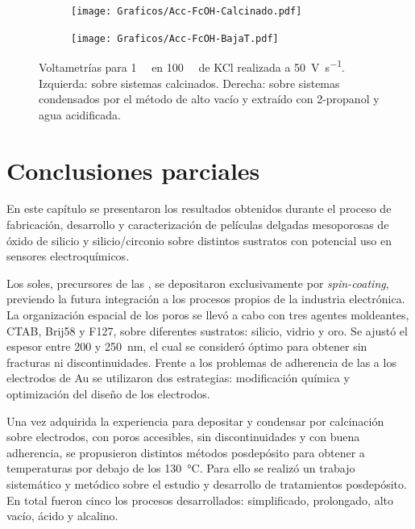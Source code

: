       		\begin{figure}[ht!]
		 	\begin{subfigure}[t]{0.5\textwidth}
		          	\texttt{[image: Graficos/Acc-FcOH-Calcinado.pdf]}
		          	\end{subfigure}
		    \begin{subfigure}[t]{0.5\textwidth}
		          	\texttt{[image: Graficos/Acc-FcOH-BajaT.pdf]}
		         	\end{subfigure}
		         	\caption[Voltagrama comparativo SF calcinados/alto vacío II]{Voltametrías para \fc\space \SI{1}{\milli\Molar} en \SI{100}{\milli\Molar} de KCl realizada a \SI{50}{\volt\per\second}. Izquierda: sobre sistemas \pdmF\space calcinados. Derecha: sobre sistemas \pdmF\space condensados por el método de alto vacío y extraído con 2-propanol y agua acidificada.}
		         	\label{fig:fcOH_accesibilidad}
		    \end{figure}     	

\pagebreak\section{Conclusiones parciales}
	
	En este capítulo se presentaron los resultados obtenidos durante el proceso de fabricación, desarrollo y caracterización de películas delgadas mesoporosas de óxido de silicio y silicio/circonio sobre distintos sustratos con potencial uso en sensores electroquímicos.
	
	Los soles, precursores de las \pdm, se depositaron exclusivamente por \textit{spin-coating}, previendo la futura integración a los procesos propios de la industria electrónica. La organización espacial de los poros se llevó a cabo con tres agentes moldeantes, CTAB, Brij58 y F127, sobre diferentes sustratos: silicio, vidrio y oro. Se ajustó el espesor entre 200 y \SI{250}{\nm}, el cual se consideró óptimo para obtener \pdm\space sin fracturas ni discontinuidades. Frente a los problemas de adherencia de las \pdm\space a los electrodos de Au se utilizaron dos estrategias: modificación química y optimización del diseño de los electrodos. 

	Una vez adquirida la experiencia para depositar y condensar por calcinación \pdm\space sobre electrodos, con poros accesibles, sin discontinuidades y con buena adherencia, se propusieron distintos métodos posdepósito para obtener \pdm\space a temperaturas por debajo de los \SI{130}{\celsius}. Para ello se realizó un trabajo sistemático y metódico sobre el estudio y desarrollo de tratamientos posdepósito. En total fueron cinco los procesos desarrollados: simplificado, prolongado, alto vacío, ácido y alcalino.

